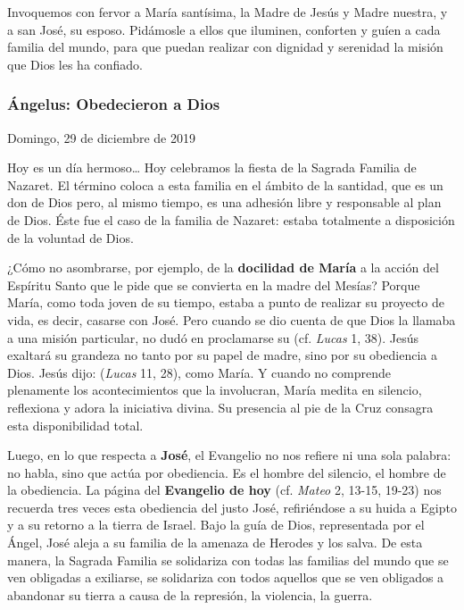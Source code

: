 Invoquemos con fervor a María santísima, la Madre de Jesús y Madre nuestra, y a san José, su esposo. Pidámosle a ellos que iluminen, conforten y guíen a cada familia del mundo, para que puedan realizar con dignidad y serenidad la misión que Dios les ha confiado.

\subsubsection{Ángelus: Obedecieron a Dios}

Domingo, 29 de diciembre de 2019

Hoy es un día hermoso\ldots{} Hoy celebramos la fiesta de la Sagrada Familia de Nazaret. El término  coloca a esta familia en el ámbito de la santidad, que es un don de Dios pero, al mismo tiempo, es una adhesión libre y responsable al plan de Dios. Éste fue el caso de la familia de Nazaret: estaba totalmente a disposición de la voluntad de Dios.

¿Cómo no asombrarse, por ejemplo, de la \textbf{docilidad de María} a la acción del Espíritu Santo que le pide que se convierta en la madre del Mesías? Porque María, como toda joven de su tiempo, estaba a punto de realizar su proyecto de vida, es decir, casarse con José. Pero cuando se dio cuenta de que Dios la llamaba a una misión particular, no dudó en proclamarse su  (cf. \emph{Lucas} 1, 38). Jesús exaltará su grandeza no tanto por su papel de madre, sino por su obediencia a Dios. Jesús dijo:  (\emph{Lucas} 11, 28), como María. Y cuando no comprende plenamente los acontecimientos que la involucran, María medita en silencio, reflexiona y adora la iniciativa divina. Su presencia al pie de la Cruz consagra esta disponibilidad total.

Luego, en lo que respecta a \textbf{José}, el Evangelio no nos refiere ni una sola palabra: no habla, sino que actúa por obediencia. Es el hombre del silencio, el hombre de la obediencia. La página del \textbf{Evangelio de hoy} (cf. \emph{Mateo} 2, 13-15, 19-23) nos recuerda tres veces esta obediencia del justo José, refiriéndose a su huida a Egipto y a su retorno a la tierra de Israel. Bajo la guía de Dios, representada por el Ángel, José aleja a su familia de la amenaza de Herodes y los salva. De esta manera, la Sagrada Familia se solidariza con todas las familias del mundo que se ven obligadas a exiliarse, se solidariza con todos aquellos que se ven obligados a abandonar su tierra a causa de la represión, la violencia, la guerra.

